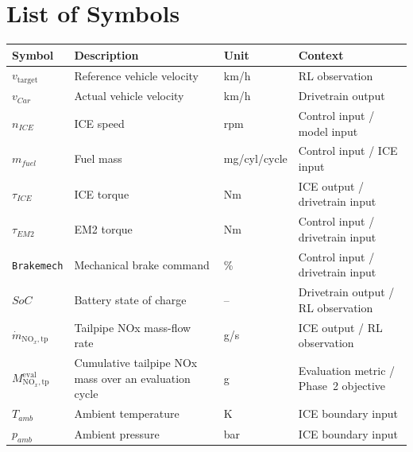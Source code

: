 \documentclass[parskip=half, fontsize=11pt]{report}
\begin{document}
\chapter*{List of Symbols}
\markboth{}{}
\begingroup
\begin{longtable}{@{}p{}p{}p{}p{}@{}}
  \toprule
  \textbf{Symbol} & \textbf{Description} & \textbf{Unit} & \textbf{Context} \\
  \midrule
  $v_{\mathrm{target}}$ & Reference vehicle velocity & km/h & RL observation \\
  $v_{Car}$ & Actual vehicle velocity & km/h & Drivetrain output \\
  $n_{ICE}$ & ICE speed & rpm & Control input / model input \\
  $m_{fuel}$ & Fuel mass & mg/cyl/cycle & Control input / ICE input \\
  $\tau_{ICE}$ & ICE torque & Nm & ICE output / drivetrain input \\
  $\tau_{EM2}$ & EM2 torque & Nm & Control input / drivetrain input \\
  \texttt{Brakemech} & Mechanical brake command & \% & Control input / drivetrain input \\
  $SoC$ & Battery state of charge & -- & Drivetrain output / RL observation \\
  $\dot m_{\mathrm{NO}_{x},\mathrm{tp}}$ & Tailpipe NOx mass-flow rate & g/s & ICE output / RL observation \\
  $M_{\mathrm{NO}_{x},\mathrm{tp}}^{\mathrm{eval}}$ & Cumulative tailpipe NOx mass over an evaluation cycle & g & Evaluation metric / Phase~2 objective \\
  $T_{amb}$ & Ambient temperature & K & ICE boundary input \\
  $p_{amb}$ & Ambient pressure & bar & ICE boundary input \\
  \bottomrule
\end{longtable}
\endgroup

\newpage

\setcounter{page}{1}

 \newpage
 \newpage
 \newpage
 \newpage
 \newpage
 \newpage
 \newpage
 \newpage

\appendix
 \newpage

\setcounter{page}{2}
\printbibliography[heading=singlemarkbibliography]
\end{document}
